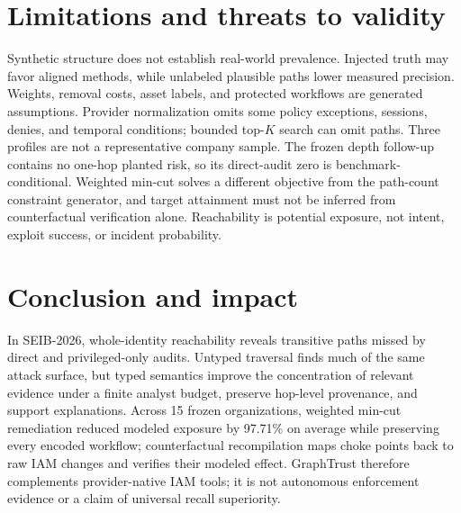 \documentclass[10pt]{article}
\begin{document}
\section{Limitations and threats to validity}

Synthetic structure does not establish real-world prevalence. Injected truth may favor aligned methods, while unlabeled plausible paths lower measured precision. Weights, removal costs, asset labels, and protected workflows are generated assumptions. Provider normalization omits some policy exceptions, sessions, denies, and temporal conditions; bounded top-$K$ search can omit paths. Three profiles are not a representative company sample. The frozen depth follow-up contains no one-hop planted risk, so its direct-audit zero is benchmark-conditional. Weighted min-cut solves a different objective from the path-count constraint generator, and target attainment must not be inferred from counterfactual verification alone. Reachability is potential exposure, not intent, exploit success, or incident probability.

\section{Conclusion and impact}

In SEIB-2026, whole-identity reachability reveals transitive paths missed by direct and privileged-only audits. Untyped traversal finds much of the same attack surface, but typed semantics improve the concentration of relevant evidence under a finite analyst budget, preserve hop-level provenance, and support explanations. Across 15 frozen organizations, weighted min-cut remediation reduced modeled exposure by 97.71\% on average while preserving every encoded workflow; counterfactual recompilation maps choke points back to raw IAM changes and verifies their modeled effect. GraphTrust therefore complements provider-native IAM tools; it is not autonomous enforcement evidence or a claim of universal recall superiority.
\end{document}
